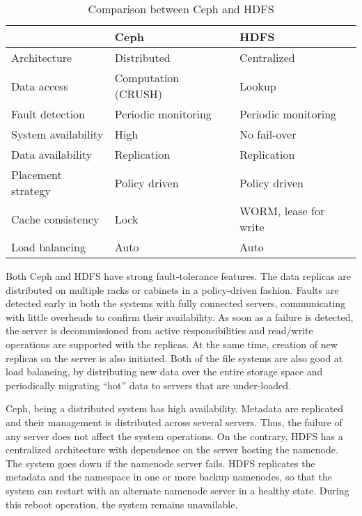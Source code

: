 \begin{table}[htbp!]
	\caption{Comparison between Ceph and HDFS \label{tab:bigdata:dfs-comparison}} {

		\begin{tabular}{p{30mm} || p{40mm} |  p{40mm} }
		\hline
			& {\bf Ceph} & {\bf HDFS} \\

		\hline
		\hline
			Architecture & Distributed & Centralized \\
		\hline
			Data access & Computation (CRUSH) & Lookup \\
		\hline
			Fault detection & Periodic monitoring & Periodic monitoring \\
		\hline
			System availability & High & No fail-over \\
		\hline
			Data availability & Replication & Replication \\
		\hline
			Placement strategy & Policy driven & Policy driven \\
		\hline
			Cache consistency & Lock & WORM, lease for write \\
		\hline
			Load balancing & Auto & Auto \\
		\hline
		\end{tabular}
	}{}
\end{table}

Both Ceph and HDFS have strong fault-tolerance features. The data replicas are distributed on multiple racks or cabinets in a 
policy-driven fashion. Faults are detected early in both the systems with fully connected servers, communicating with little 
overheads to confirm their availability. As soon as a failure is detected, the server is decommissioned from active responsibilities
and read/write operations are supported with the replicas. At the same time, creation of new replicas on the server is also initiated. 
Both of the file systems are also good at load balancing, by distributing new data over the entire storage space and periodically 
migrating ``hot'' data to servers that are under-loaded.

Ceph, being a distributed system has high availability. Metadata are replicated and their management is distributed across several 
servers. Thus, the failure of any server does not affect the system operations. On the contrary, HDFS has a centralized architecture
with dependence on the server hosting the namenode. The system goes down if the namenode server fails. HDFS replicates the metadata
and the namespace in one or more backup namenodes, so that the system can restart with an alternate namenode server in a healthy state.
During this reboot operation, the system remains unavailable.

